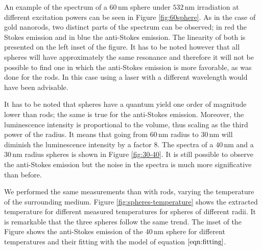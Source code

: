 \documentclass[journal=nalefd,manuscript=letter]{achemso}
\newcommand{\nm}{\ensuremath{\,\textrm{nm}}}
\begin{document}
An example of the spectrum of a $60\nm$ sphere under $532\nm$ irradiation at
different excitation powers can be seen in Figure \ref{fig:60sphere}.
As in the case of gold nanorods, two distinct parts of the spectrum can be
observed; in red the Stokes emission and in blue the anti-Stokes emission. The
linearity of both is presented on the left inset of the figure. It has to be
noted however that all spheres will have approximately the same resonance and
therefore it will not be possible to find one in which the anti-Stokes emission
is more favorable, as was done for the rods. In this case using a laser with a
different wavelength would have been advisable. 

It has to be noted that spheres have a quantum yield one order of magnitude
lower than rods; the same is true for the anti-Stokes emission. Moreover, the
luminescence intensity is proportional to the volume, thus scaling as the third 
power of the radius. It means that going from $60\nm$ radius to $30\nm$ will
diminish the luminescence intensity by a factor $8$. The spectra of a $40\nm$
and a $30\nm$ radius spheres is shown in Figure \ref{fig:30-40}. It is still
possible to observe the anti-Stokes emission but the noise in the spectra is
much more significative than before. 

We performed the same measurements than with rods, varying the temperature of
the surrounding medium. Figure \ref{fig:spheres-temperature} shows the extracted
temperature for different measured temperatures for spheres of different radii.
It is remarkable that the three spheres follow the same trend. The inset of
the Figure shows the anti-Stokes emission of the $40\nm$ sphere for different
temperatures and their fitting with the model of equation $\ref{eqn:fitting}$.
\end{document}
